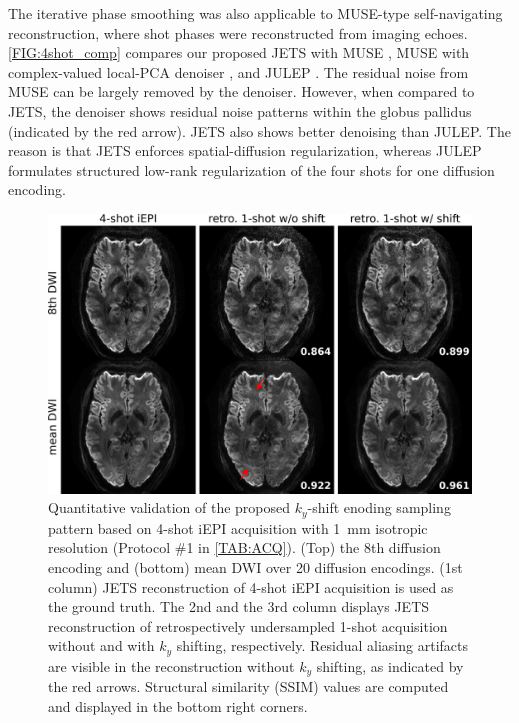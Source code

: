\documentclass[preprint,12pt,authoryear,review]{elsarticle}
\begin{document}
    The iterative phase smoothing was also applicable to
    MUSE-type self-navigating reconstruction,
    where shot phases were
    reconstructed from imaging echoes.
    \cref{FIG:4shot_comp} compares our proposed JETS with
    MUSE \citep{chen_2013_muse},
    MUSE with complex-valued local-PCA denoiser
    \citep{cordero_2019_cplxdwi},
    and JULEP \citep{dai_2023_julep}.
    The residual noise from MUSE can be largely removed
    by the denoiser. However, when compared to JETS,
    the denoiser shows residual noise patterns within
    the globus pallidus (indicated by the red arrow).
    JETS also shows better denoising than JULEP.
    The reason is that JETS enforces spatial-diffusion regularization,
    whereas JULEP formulates structured low-rank regularization
    of the four shots for one diffusion encoding.


    \begin{figure}
        \centering
        \includegraphics[width=\textwidth]{../figures/fig5.png}
        \caption{Quantitative validation of the proposed
        $k_y$-shift enoding sampling pattern
        based on 4-shot iEPI acquisition with 1~mm isotropic resolution
        (Protocol \#1 in \cref{TAB:ACQ}).
        (Top) the 8th diffusion encoding and
        (bottom) mean DWI over 20 diffusion encodings.
        (1st column) JETS reconstruction of 4-shot iEPI acquisition
        is used as the ground truth.
        The 2nd and the 3rd column displays JETS reconstruction
        of retrospectively undersampled
        1-shot acquisition without and with $k_y$ shifting,
        respectively.
        Residual aliasing artifacts are visible in the reconstruction
        without $k_y$ shifting, as indicated by the red arrows.
        Structural similarity (SSIM) values are computed and
        displayed in the bottom right corners.}
        \label{FIG:retro}
    \end{figure}
\end{document}
